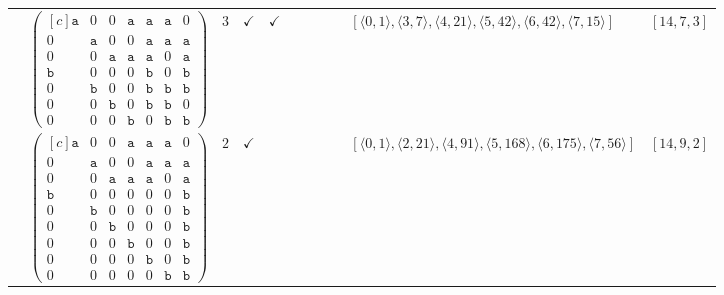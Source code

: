 \documentclass[12pt]{article}
\theoremstyle{definition}
\theoremstyle{plain}
\begin{document}
{\begin{longtable}{@{}cYcccccccZc@{}}
& $\begin{pmatrix*}[c]
\mathtt{a}   &  0    &  0    &   \mathtt{a}  &  \mathtt{a}  &  \mathtt{a}  &  0  \\
0   &  \mathtt{a}    &  0    &   0  &  \mathtt{a}  &  \mathtt{a}  &  \mathtt{a}  \\
0   &  0    &  \mathtt{a}    &   \mathtt{a}  &  \mathtt{a}  &  0  &  \mathtt{a}  \\
\mathtt{b}   &  0    &  0    &   0  &  \mathtt{b}  &  0  &  \mathtt{b}  \\
0   &  \mathtt{b}    &  0    &   0  &  \mathtt{b}  &  \mathtt{b}  &  \mathtt{b}  \\
0   &  0    &  \mathtt{b}    &   0  &  \mathtt{b}  &  \mathtt{b}  &  0  \\
0   &  0    &  0    &   \mathtt{b}  &  0  &  \mathtt{b}  &  \mathtt{b}
\end{pmatrix*}$
& $3$
& $\checkmark$
& $\checkmark$
&
&
&
&
& $[\langle0,1\rangle,\allowbreak\langle3,7\rangle,\allowbreak\langle4,21\rangle,\allowbreak\langle5,42\rangle,\allowbreak\langle6,42\rangle,\allowbreak\langle7,15\rangle]$
& $[14,7,3]$ \\

\cmidrule(lr){2-11}


& $\begin{pmatrix*}[c]
\mathtt{a}   &  0    &  0    &   \mathtt{a}  &  \mathtt{a}  &  \mathtt{a}  &  0  \\
0   &  \mathtt{a}    &  0    &   0  &  \mathtt{a}  &  \mathtt{a}  &  \mathtt{a}  \\
0   &  0    &  \mathtt{a}    &   \mathtt{a}  &  \mathtt{a}  &  0  &  \mathtt{a}  \\
\mathtt{b}   &  0    &  0    &   0  &  0  &  0  &  \mathtt{b}  \\
0   &  \mathtt{b}    &  0    &   0  &  0  &  0  &  \mathtt{b}  \\
0   &  0    &  \mathtt{b}    &   0  &  0  &  0  &  \mathtt{b}  \\
0   &  0    &  0    &   \mathtt{b}  &  0  &  0  &  \mathtt{b}  \\
0   &  0    &  0    &   0  &  \mathtt{b}  &  0  &  \mathtt{b}  \\
0   &  0    &  0    &   0  &  0  &  \mathtt{b}  &  \mathtt{b}
\end{pmatrix*}$
& $2$
& $\checkmark$
&
&
&
&
&
& $[\langle0,1\rangle,\allowbreak\langle2,21\rangle,\allowbreak\langle4,91\rangle,\allowbreak\langle5,168\rangle,\allowbreak\langle6,175\rangle,\allowbreak\langle7,56\rangle]$
& $[14,9,2]$ \\


\end{longtable}}
\end{document}
